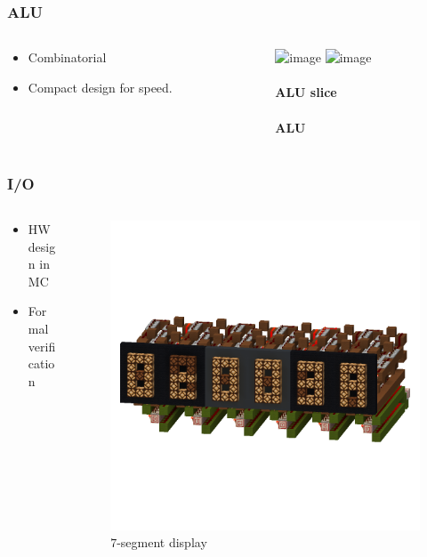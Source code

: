 \documentclass[aspectratio=169]{beamer}
\newcommand{\hw}{HW}
\begin{document}
\begin{frame}
	\frametitle{ALU}
	\begin{columns}
		\begin{column}{0.4\textwidth}
			\begin{itemize}
				\item Combinatorial
				\item Compact design for speed.
			\end{itemize}
		\end{column}
		\begin{column}{0.6\textwidth}
			\begin{center}
				\includegraphics<1>[width=\textwidth]{imgs/alu_slice.png}
				\includegraphics<2->[width=0.8\textwidth]{imgs/alu.png}

				\framesubtitle<1>{ALU slice}
				\framesubtitle<2->{ALU}
			\end{center}
		\end{column}
	\end{columns}
\end{frame}

\begin{frame}
	\frametitle{I/O}
	\begin{columns}
		\begin{column}{0.4\textwidth}
			\begin{itemize}
				\item \hw{} design in MC
				\item Formal verification
			\end{itemize}
		\end{column}
		\begin{column}{0.6\textwidth}
			\begin{figure}
				\includegraphics[width=\textwidth]{imgs/screen.png}
				\caption*{$7$-segment display}
			\end{figure}
		\end{column}
	\end{columns}
\end{frame}
\end{document}
